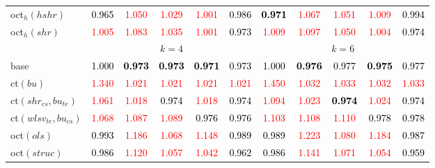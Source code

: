 \begin{tabular}[t]{l|>{}cccc>{}c|ccccc}
oct$_h(hshr)$ & \textcolor{black}{0.965} & \textcolor{red}{1.050} & \textcolor{red}{1.029} & \textcolor{red}{1.001} & \textcolor{black}{0.986} & \textcolor{black}{\textbf{0.971}} & \textcolor{red}{1.067} & \textcolor{red}{1.051} & \textcolor{red}{1.009} & \textcolor{black}{0.994}\\
oct$_h(shr)$ & \textcolor{red}{1.005} & \textcolor{red}{1.083} & \textcolor{red}{1.035} & \textcolor{red}{1.001} & \textcolor{black}{0.973} & \textcolor{red}{1.009} & \textcolor{red}{1.097} & \textcolor{red}{1.050} & \textcolor{red}{1.004} & \textcolor{black}{0.974}\\
\addlinespace[0.3em]
\multicolumn{1}{c}{} & \multicolumn{5}{c}{\textbf{$k = 4$}} & \multicolumn{5}{c}{\textbf{$k = 6$}}\\
base & \textcolor{black}{1.000} & \textcolor{black}{\textbf{0.973}} & \textcolor{black}{\textbf{0.973}} & \textcolor{black}{\textbf{0.971}} & \textcolor{black}{0.973} & \textcolor{black}{1.000} & \textcolor{black}{\textbf{0.976}} & \textcolor{black}{0.977} & \textcolor{black}{\textbf{0.975}} & \textcolor{black}{0.977}\\
ct$(bu)$ & \textcolor{red}{1.340} & \textcolor{red}{1.021} & \textcolor{red}{1.021} & \textcolor{red}{1.021} & \textcolor{red}{1.021} & \textcolor{red}{1.450} & \textcolor{red}{1.032} & \textcolor{red}{1.033} & \textcolor{red}{1.032} & \textcolor{red}{1.033}\\
ct$(shr_{cs}, bu_{te})$ & \textcolor{red}{1.061} & \textcolor{red}{1.018} & \textcolor{black}{0.974} & \textcolor{red}{1.018} & \textcolor{black}{0.974} & \textcolor{red}{1.094} & \textcolor{red}{1.023} & \textcolor{black}{\textbf{0.974}} & \textcolor{red}{1.024} & \textcolor{black}{0.974}\\
ct$(wlsv_{te}, bu_{cs})$ & \textcolor{red}{1.068} & \textcolor{red}{1.087} & \textcolor{red}{1.089} & \textcolor{black}{0.976} & \textcolor{black}{0.976} & \textcolor{red}{1.103} & \textcolor{red}{1.108} & \textcolor{red}{1.110} & \textcolor{black}{0.978} & \textcolor{black}{0.978}\\
oct$(ols)$ & \textcolor{black}{0.993} & \textcolor{red}{1.186} & \textcolor{red}{1.068} & \textcolor{red}{1.148} & \textcolor{black}{0.989} & \textcolor{black}{0.989} & \textcolor{red}{1.223} & \textcolor{red}{1.080} & \textcolor{red}{1.184} & \textcolor{black}{0.987}\\
oct$(struc)$ & \textcolor{black}{0.986} & \textcolor{red}{1.120} & \textcolor{red}{1.057} & \textcolor{red}{1.042} & \textcolor{black}{0.962} & \textcolor{black}{0.986} & \textcolor{red}{1.141} & \textcolor{red}{1.071} & \textcolor{red}{1.054} & \textcolor{black}{0.959}\\

\end{tabular}
